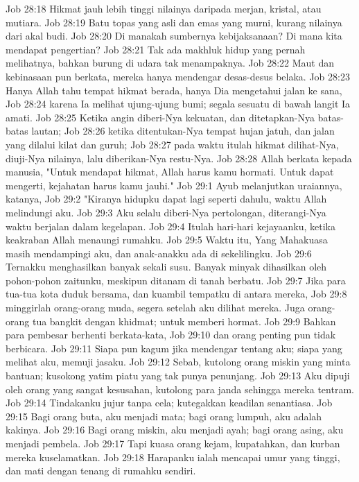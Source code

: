 Job 28:18  Hikmat jauh lebih tinggi nilainya daripada merjan, kristal, atau mutiara.
Job 28:19  Batu topas yang asli dan emas yang murni, kurang nilainya dari akal budi.
Job 28:20  Di manakah sumbernya kebijaksanaan? Di mana kita mendapat pengertian?
Job 28:21  Tak ada makhluk hidup yang pernah melihatnya, bahkan burung di udara tak menampaknya.
Job 28:22  Maut dan kebinasaan pun berkata, mereka hanya mendengar desas-desus belaka.
Job 28:23  Hanya Allah tahu tempat hikmat berada, hanya Dia mengetahui jalan ke sana,
Job 28:24  karena Ia melihat ujung-ujung bumi; segala sesuatu di bawah langit Ia amati.
Job 28:25  Ketika angin diberi-Nya kekuatan, dan ditetapkan-Nya batas-batas lautan;
Job 28:26  ketika ditentukan-Nya tempat hujan jatuh, dan jalan yang dilalui kilat dan guruh;
Job 28:27  pada waktu itulah hikmat dilihat-Nya, diuji-Nya nilainya, lalu diberikan-Nya restu-Nya.
Job 28:28  Allah berkata kepada manusia, "Untuk mendapat hikmat, Allah harus kamu hormati. Untuk dapat mengerti, kejahatan harus kamu jauhi."
Job 29:1  Ayub melanjutkan uraiannya, katanya,
Job 29:2  "Kiranya hidupku dapat lagi seperti dahulu, waktu Allah melindungi aku.
Job 29:3  Aku selalu diberi-Nya pertolongan, diterangi-Nya waktu berjalan dalam kegelapan.
Job 29:4  Itulah hari-hari kejayaanku, ketika keakraban Allah menaungi rumahku.
Job 29:5  Waktu itu, Yang Mahakuasa masih mendampingi aku, dan anak-anakku ada di sekelilingku.
Job 29:6  Ternakku menghasilkan banyak sekali susu. Banyak minyak dihasilkan oleh pohon-pohon zaitunku, meskipun ditanam di tanah berbatu.
Job 29:7  Jika para tua-tua kota duduk bersama, dan kuambil tempatku di antara mereka,
Job 29:8  minggirlah orang-orang muda, segera setelah aku dilihat mereka. Juga orang-orang tua bangkit dengan khidmat; untuk memberi hormat.
Job 29:9  Bahkan para pembesar berhenti berkata-kata,
Job 29:10  dan orang penting pun tidak berbicara.
Job 29:11  Siapa pun kagum jika mendengar tentang aku; siapa yang melihat aku, memuji jasaku.
Job 29:12  Sebab, kutolong orang miskin yang minta bantuan; kusokong yatim piatu yang tak punya penunjang.
Job 29:13  Aku dipuji oleh orang yang sangat kesusahan, kutolong para janda sehingga mereka tentram.
Job 29:14  Tindakanku jujur tanpa cela; kutegakkan keadilan senantiasa.
Job 29:15  Bagi orang buta, aku menjadi mata; bagi orang lumpuh, aku adalah kakinya.
Job 29:16  Bagi orang miskin, aku menjadi ayah; bagi orang asing, aku menjadi pembela.
Job 29:17  Tapi kuasa orang kejam, kupatahkan, dan kurban mereka kuselamatkan.
Job 29:18  Harapanku ialah mencapai umur yang tinggi, dan mati dengan tenang di rumahku sendiri.

